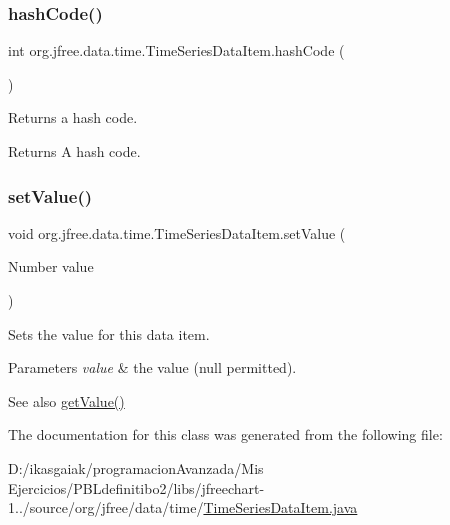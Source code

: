 \subsubsection{\texorpdfstring{hash\+Code()}{hashCode()}}
{\footnotesize\ttfamily int org.\+jfree.\+data.\+time.\+Time\+Series\+Data\+Item.\+hash\+Code (\begin{DoxyParamCaption}{ }\end{DoxyParamCaption})}

Returns a hash code.

\begin{DoxyReturn}{Returns}
A hash code. 
\end{DoxyReturn}
\mbox{\label{classorg_1_1jfree_1_1data_1_1time_1_1_time_series_data_item_af1b0f84dad2ed0cbced4746bd9c3a8d1}} 
\subsubsection{\texorpdfstring{set\+Value()}{setValue()}}
{\footnotesize\ttfamily void org.\+jfree.\+data.\+time.\+Time\+Series\+Data\+Item.\+set\+Value (\begin{DoxyParamCaption}\item[{Number}]{value }\end{DoxyParamCaption})}

Sets the value for this data item.


\begin{DoxyParams}{Parameters}
{\em value} & the value ({\ttfamily null} permitted).\\
\hline
\end{DoxyParams}
\begin{DoxySeeAlso}{See also}
\mbox{\hyperlink{classorg_1_1jfree_1_1data_1_1time_1_1_time_series_data_item_aae8a91f28931ae9e1207f64124294896}{get\+Value()}} 
\end{DoxySeeAlso}


The documentation for this class was generated from the following file\+:\begin{DoxyCompactItemize}
\item 
D\+:/ikasgaiak/programacion\+Avanzada/\+Mis Ejercicios/\+P\+B\+Ldefinitibo2/libs/jfreechart-\/1../source/org/jfree/data/time/\mbox{\hyperlink{_time_series_data_item_8java}{Time\+Series\+Data\+Item.\+java}}\end{DoxyCompactItemize}
